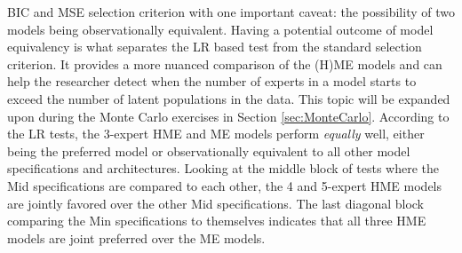 \documentclass[12pt]{article}
\theoremstyle{definition}
\begin{document}
BIC and MSE selection criterion with one important caveat: the possibility of two models
being observationally equivalent. Having a potential outcome of model equivalency
is what separates the LR based test from the standard selection criterion.
It provides a more nuanced comparison of the (H)ME models and can help the researcher
detect when the number of experts in a model starts to exceed the number of latent
populations in the data. This topic will be expanded upon during the Monte Carlo
exercises in Section \ref{sec:MonteCarlo}. According to the LR tests, the 3-expert HME
and ME models perform \emph{equally} well, either being the preferred model
or observationally equivalent to all other model specifications and architectures.
Looking at the middle block of tests where the Mid specifications are
compared to each other, the 4 and 5-expert HME models are jointly favored 
over the other Mid specifications. The last diagonal block comparing the Min
specifications to themselves indicates that all three HME models are joint preferred
over the ME models. 
\end{document}
